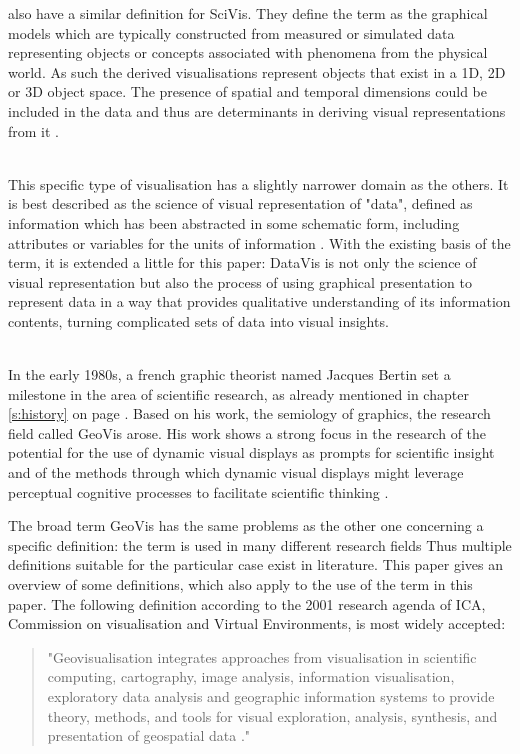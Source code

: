 \begin{enumerate}
\citeauthor{Ferreira2003} also have a similar definition for \ac{SciVis}. They define the term as the graphical models which are typically constructed from measured or simulated data representing objects or concepts associated with phenomena from the physical world. As such the derived visualisations represent objects that exist in a 1D, 2D or 3D object space. The presence of spatial and temporal dimensions could be included in the data and thus are determinants in deriving visual representations from it .

 \hfill \\
This specific type of visualisation has a slightly narrower domain as the others. It is best described as the science of visual representation of "data", defined as information which has been abstracted in some schematic form, including attributes or variables for the units of information .
With the existing basis of the term, it is extended a little for this paper: \ac{DataVis} is not only the science of visual representation but also the process of using graphical presentation to represent data in a way that provides qualitative understanding of its information contents, turning complicated sets of data into visual insights.

 \hfill \\
In the early 1980s, a french graphic theorist named Jacques Bertin set a milestone in the area of scientific research, as already mentioned in chapter \ref{s:history} on page \pageref{crossref:bertain}. Based on his work, the semiology of graphics, the research field called \ac{GeoVis} arose. His work shows a strong focus in the research of the potential for the use of dynamic visual displays as prompts for scientific insight and of the methods through which dynamic visual displays might leverage perceptual cognitive processes to facilitate scientific thinking .

The broad term \ac{GeoVis} has the same problems as the other one concerning a specific definition: the term is used in many different research fields Thus multiple definitions suitable for the particular case exist in literature. This paper gives an overview of some definitions, which also apply to the use of the term in this paper.
The following definition according to the 2001 research agenda of \ac{ICA}, Commission on visualisation and Virtual Environments, is most widely accepted:
\begin{quote}
"Geovisualisation integrates approaches from visualisation in scientific computing, cartography, image analysis, information visualisation, exploratory data analysis and geographic information systems to provide theory, methods, and tools for visual exploration, analysis, synthesis, and presentation of geospatial data ."
\end{quote}


\end{enumerate}
